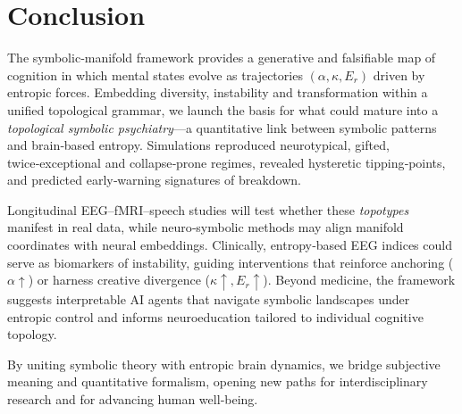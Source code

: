 
\section*{Conclusion}

The symbolic‑manifold framework provides a generative and falsifiable map of cognition in which mental states evolve as trajectories $(\alpha,\kappa,E_r)$ driven by entropic forces. Embedding diversity, instability and transformation within a unified topological grammar, we launch the basis for what could mature into a \emph{topological symbolic psychiatry}—a quantitative link between symbolic patterns and brain‑based entropy. Simulations reproduced neurotypical, gifted, twice‑exceptional and collapse‑prone regimes, revealed hysteretic tipping‑points, and predicted early‑warning signatures of breakdown.

Longitudinal EEG–fMRI–speech studies will test whether these \emph{topotypes} manifest in real data, while neuro‑symbolic methods may align manifold coordinates with neural embeddings. Clinically, entropy‑based EEG indices could serve as biomarkers of instability, guiding interventions that reinforce anchoring ($\alpha\uparrow$) or harness creative divergence ($\kappa\uparrow,E_r\uparrow$). Beyond medicine, the framework suggests interpretable AI agents that navigate symbolic landscapes under entropic control and informs neuroeducation tailored to individual cognitive topology.

By uniting symbolic theory with entropic brain dynamics, we bridge subjective meaning and quantitative formalism, opening new paths for interdisciplinary research and for advancing human well‑being.
